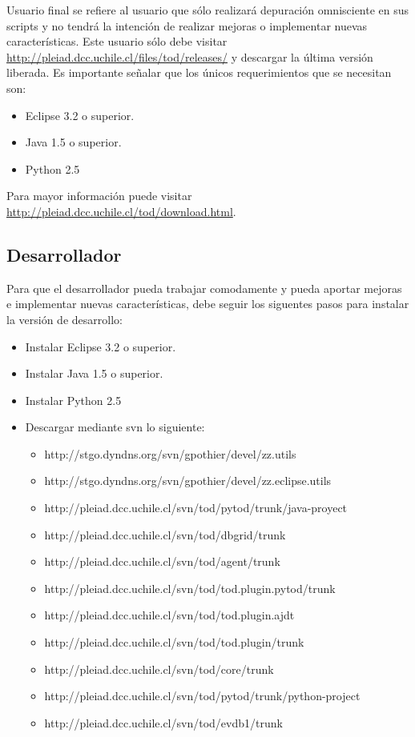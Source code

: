 \documentclass[12pt,legalpaper]{report}
\begin{document}
Usuario final se refiere al usuario que sólo realizará depuración omnisciente en sus scripts y no tendrá la intención de realizar mejoras o implementar nuevas características.  Este usuario sólo debe visitar \href{http://pleiad.dcc.uchile.cl/files/tod/releases/}{http://pleiad.dcc.uchile.cl/files/tod/releases/} y descargar la última versión liberada.  Es importante señalar que los únicos requerimientos que se necesitan son:
\begin{itemize}
	\item Eclipse 3.2 o superior.
	\item Java 1.5 o superior.
	\item Python 2.5
\end{itemize}	

Para mayor información puede visitar \href{http://pleiad.dcc.uchile.cl/tod/download.html}{http://pleiad.dcc.uchile.cl/tod/download.html}.
		
		\subsection{Desarrollador}
		
Para que el desarrollador pueda trabajar comodamente y pueda aportar mejoras e implementar nuevas características, debe seguir los siguentes pasos para instalar la versión de desarrollo:

\begin{itemize}
	\item Instalar Eclipse 3.2 o superior.
	\item Instalar Java 1.5 o superior.
	\item Instalar Python 2.5
	 \item Descargar mediante svn lo siguiente:
	 \begin{itemize}
		\item http://stgo.dyndns.org/svn/gpothier/devel/zz.utils
		\item http://stgo.dyndns.org/svn/gpothier/devel/zz.eclipse.utils
		\item http://pleiad.dcc.uchile.cl/svn/tod/pytod/trunk/java-proyect
		\item http://pleiad.dcc.uchile.cl/svn/tod/dbgrid/trunk
		\item http://pleiad.dcc.uchile.cl/svn/tod/agent/trunk
		\item http://pleiad.dcc.uchile.cl/svn/tod/tod.plugin.pytod/trunk
		\item http://pleiad.dcc.uchile.cl/svn/tod/tod.plugin.ajdt
		\item http://pleiad.dcc.uchile.cl/svn/tod/tod.plugin/trunk
		\item http://pleiad.dcc.uchile.cl/svn/tod/core/trunk
		\item http://pleiad.dcc.uchile.cl/svn/tod/pytod/trunk/python-project
		\item http://pleiad.dcc.uchile.cl/svn/tod/evdb1/trunk
	 \end{itemize}
\end{itemize}
\end{document}
